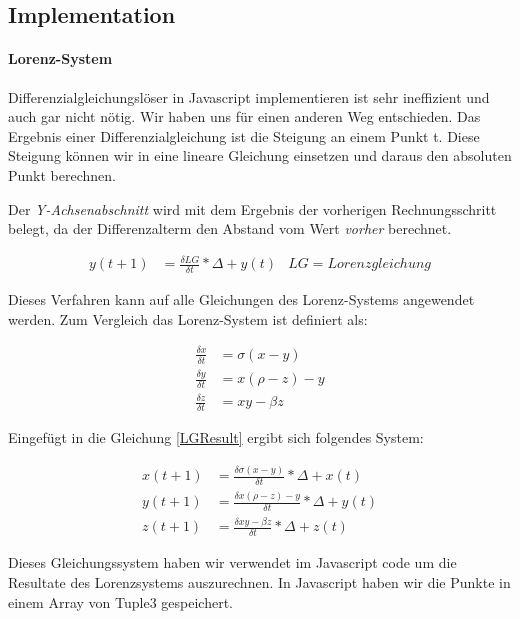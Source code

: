 \documentclass[implementation]{subfiles}
\begin{document}
	\subsection{Implementation}
	
	\paragraph{Lorenz-System}
	Differenzialgleichungslöser in Javascript implementieren ist sehr ineffizient und auch gar nicht nötig. Wir haben uns für einen anderen Weg entschieden. Das Ergebnis einer Differenzialgleichung ist die Steigung an einem Punkt t. Diese Steigung können wir in eine lineare Gleichung einsetzen und daraus den absoluten Punkt berechnen.
	
	Der \textit{Y-Achsenabschnitt} wird mit dem Ergebnis der vorherigen Rechnungsschritt belegt, da der Differenzalterm den Abstand vom Wert \textit{vorher} berechnet.  
	
	\begin{align}
		\label{LGResult}
		y(t + 1) &= \frac{\delta LG}{\delta t} * \Delta + y(t) & LG = Lorenzgleichung
	\end{align}
	
	Dieses Verfahren kann auf alle Gleichungen des Lorenz-Systems angewendet werden. Zum Vergleich das Lorenz-System ist definiert als:
	\begin{centerFigure}
		\begin{align}
			\frac{\delta x}{\delta t} &= \sigma(x - y)\\
			\frac{\delta y}{\delta t} &= x(\rho - z) - y\\
			\frac{\delta z}{\delta t} &= xy - \beta z
		\end{align}
	\end{centerFigure}

	Eingefügt in die Gleichung \eqref{LGResult} ergibt sich folgendes System:
	
	\begin{centerFigure}
		\begin{align}
			x(t + 1) &= \frac{\delta \sigma(x - y)}{\delta t} * \Delta + x(t)\\
			y(t + 1) &= \frac{\delta x(\rho - z) - y}{\delta t} * \Delta + y(t)\\
			z(t + 1) &= \frac{\delta xy - \beta z}{\delta t} * \Delta + z(t)
		\end{align}
	\end{centerFigure}
	
	Dieses Gleichungssystem haben wir verwendet im Javascript code um die Resultate des Lorenzsystems auszurechnen. In Javascript haben wir die Punkte in einem Array von Tuple3 gespeichert.
	
\end{document}
